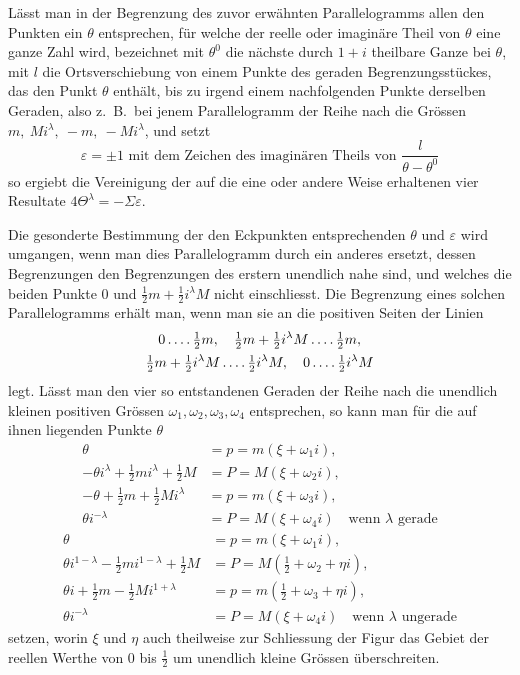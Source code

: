 Lässt man in der Begrenzung des zuvor erwähnten Parallelogramms allen den Punkten ein $\theta$ entsprechen, für welche der reelle oder imaginäre Theil von $\theta$ eine ganze Zahl wird, bezeichnet mit $\theta^0$ die nächste durch $1+i$ theilbare Ganze bei $\theta$, mit $l$ die Ortsverschiebung von einem Punkte des geraden Begrenzungsstückes, das den Punkt $\theta$ enthält, bis zu irgend einem nachfolgenden Punkte derselben Geraden, also z.\ B.\ bei jenem Parallelogramm der Reihe nach die Grössen $m,\ Mi^\lambda,\ -m,\ -Mi^\lambda$, und setzt
\[
\varepsilon=\pm1\text{ mit dem Zeichen des imaginären Theils von }\frac l{\theta-\theta^0}
\]
so ergiebt die Vereinigung der auf die eine oder andere Weise erhaltenen vier Resultate $4\Theta^\lambda=-\Sigma\varepsilon$.

Die gesonderte Bestimmung der den Eckpunkten entsprechenden $\theta$ und $\varepsilon$ wird umgangen, wenn man dies Parallelogramm durch ein anderes ersetzt, dessen Begrenzungen den Begrenzungen des erstern
%
unendlich nahe sind, und welches die beiden Punkte $0$ und $\tfrac12m+\tfrac12i^\lambda M$ nicht einschliesst. Die Begrenzung eines solchen Parallelogramms erhält man, wenn man sie an die positiven Seiten der Linien
\[
\begin{gathered}
0\mathinner{.\,.\,.\,.}\tfrac12m,\quad\tfrac12m+\tfrac12i^\lambda M\mathinner{.\,.\,.\,.}\tfrac12m,\\
\tfrac12m+\tfrac12i^\lambda M\mathinner{.\,.\,.\,.}\tfrac12i^\lambda M,\quad 0\mathinner{.\,.\,.\,.}\tfrac12i^\lambda M
\end{gathered}
\]
legt. Lässt man den vier so entstandenen Geraden der Reihe nach die unendlich kleinen positiven Grössen $\omega_1,\omega_2,\omega_3,\omega_4$ entsprechen, so kann man für die auf ihnen liegenden Punkte $\theta$
\[
\begin{aligned}
\theta&=p=m(\xi+\omega_1i),\\
-\theta i^\lambda+\tfrac12mi^\lambda+\tfrac12M&=P=M(\xi+\omega_2i),\\
-\theta+\tfrac12m+\tfrac12Mi^\lambda&=p=m(\xi+\omega_3i),\\
\theta i^{-\lambda}&=P=M(\xi+\omega_4i)\quad\text{wenn }\lambda\text{ gerade}
\end{aligned}
\]
\[
\begin{aligned}
\theta&=p=m(\xi+\omega_1i),\\
\theta i^{1-\lambda}-\tfrac12mi^{1-\lambda}+\tfrac12M&=P=M(\tfrac12+\omega_2+\eta i),\\
\theta i+\tfrac12m-\tfrac12Mi^{1+\lambda}&=p=m(\tfrac12+\omega_3+\eta i),\\
\theta i^{-\lambda}&=P=M(\xi+\omega_4i)\quad\text{wenn }\lambda\text{ ungerade}
\end{aligned}
\]
setzen, worin $\xi$ und $\eta$ auch theilweise zur Schliessung der Figur das Gebiet der reellen Werthe von $0$ bis $\tfrac12$ um unendlich kleine Grössen überschreiten.

